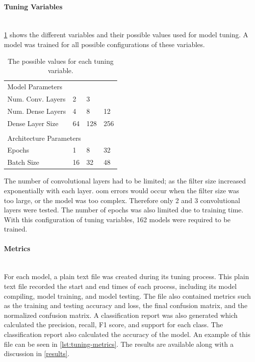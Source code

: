\documentclass[12pt]{article}
\begin{document}
\paragraph{Tuning Variables}\label{variables}\mbox{}\\

\ref{tab:variables} shows the different variables and their possible values used for model tuning. A model was trained for all possible configurations of these variables.

\begin{table}[H]
\centering
\begin{tabular}{llll}
\multicolumn{4}{l}{Model Parameters}        \\
Num. Conv. Layers    & 2     & 3     &      \\
Num. Dense Layers    & 4     & 8     & 12   \\
Dense Layer Size     & 64    & 128   & 256  \\ 
& & & \\
\multicolumn{4}{l}{Architecture Parameters} \\
Epochs               & 1     & 8     & 32   \\
Batch Size           & 16    & 32    & 48  
\end{tabular}
\caption{The possible values for each tuning variable.}
\label{tab:variables}
\end{table}

The number of convolutional layers had to be limited; as the filter size increased exponentially with each layer. \acrfull{oom} errors would occur when the filter size was too large, or the model was too complex. Therefore only 2 and 3 convolutional layers were tested. The number of epochs was also limited due to training time. With this configuration of tuning variables, 162 models were required to be trained.

\paragraph{Metrics}\mbox{}\\

For each model, a plain text file was created during its tuning process. This plain text file recorded the start and end times of each process, including its model compiling, model training, and model testing. The file also contained metrics such as the training and testing accuracy and loss, the final confusion matrix, and the normalized confusion matrix. A classification report was also generated which calculated the precision, recall, F1 score, and support for each class. The classification report also calculated the accuracy of the model. An example of this file can be seen in \ref{lst:tuning-metrics}. The results are available along with a discussion in \ref{results}.
\end{document}
